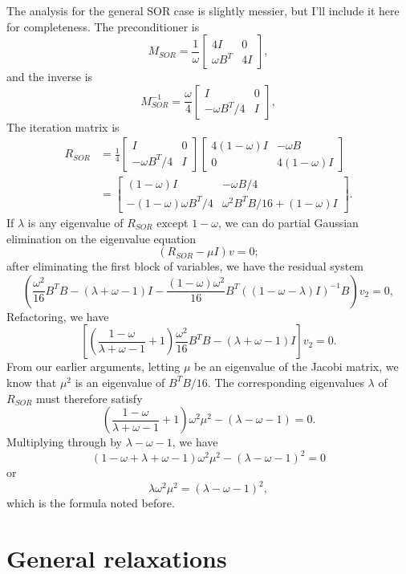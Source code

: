 \documentclass[12pt, leqno]{article} %
\begin{document}
The analysis for the general SOR case is slightly messier, but I'll
include it here for completeness.  The preconditioner is
\[
  M_{SOR} = \frac{1}{\omega}
  \begin{bmatrix} 4I & 0 \\ \omega B^T & 4I \end{bmatrix},
\]
and the inverse is
\[
  M_{SOR}^{-1} =
  \frac{\omega}{4} \begin{bmatrix} I & 0 \\ -\omega B^T/4 & I \end{bmatrix},
\]
The iteration matrix is
\begin{align*}
  R_{SOR} &=
  \frac{1}{4} \begin{bmatrix} I & 0 \\ -\omega B^T/4 & I \end{bmatrix}
  \begin{bmatrix} 4(1-\omega) I & -\omega B \\ 0 & 4(1-\omega) I \end{bmatrix} \\
  &=
  \begin{bmatrix}
    (1-\omega) I & -\omega B/4 \\
    -(1-\omega) \omega B^T/4 & \omega^2 B^T B/16 + (1-\omega) I
  \end{bmatrix}.
\end{align*}
If $\lambda$ is any eigenvalue of $R_{SOR}$ except $1-\omega$, we can do
partial Gaussian elimination on the eigenvalue equation
\[
  (R_{SOR}-\mu I) v = 0;
\]
after eliminating the first block of variables, we have the residual system
\[
  \left(\frac{\omega^2}{16} B^T B-(\lambda+\omega-1) I - \frac{(1-\omega)\omega^2}{16} B^T ((1-\omega-\lambda) I)^{-1} B\right)
v_2 = 0,
\]
Refactoring, we have
\[
  \left[
\left( \frac{1-\omega}{\lambda+\omega-1} + 1 \right)
  \frac{\omega^2}{16} B^T B - (\lambda+\omega-1) I \right] v_2 = 0.
\]
From our earlier arguments, letting $\mu$ be an eigenvalue of the
Jacobi matrix, we know that $\mu^2$ is an eigenvalue of $B^T B/16$.  The
corresponding eigenvalues $\lambda$ of $R_{SOR}$ must therefore
satisfy
\[
  \left( \frac{1-\omega}{\lambda+\omega-1} + 1 \right) \omega^2 \mu^2 - (\lambda-\omega-1) = 0.
\]
Multiplying through by $\lambda-\omega-1$, we have
\[
  (1-\omega + \lambda + \omega - 1) \omega^2 \mu^2 -
  (\lambda-\omega-1)^2 = 0
\]
or
\[
 \lambda \omega^2 \mu^2 = (\lambda - \omega - 1)^2,
\]
which is the formula noted before.

\section{General relaxations}
\end{document}
